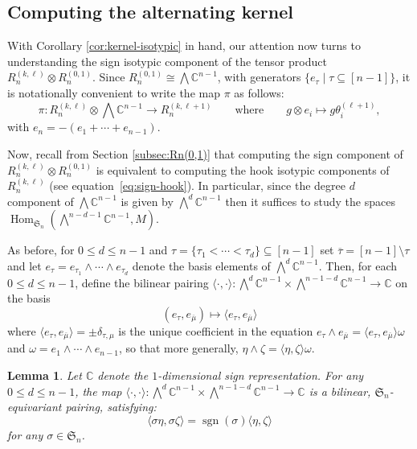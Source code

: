 \documentclass[11pt, reqno]{amsart}
\newtheorem{lemma}[theorem]{Lemma}
\theoremstyle{definition}
\theoremstyle{remark}
\numberwithin{equation}{section}
\newcommand{\0}{\emptyset}
\newcommand{\C}{\mathbb{C}}
\renewcommand{\S}{\mathfrak{S}}
\DeclareMathOperator{\sgn}{sgn}
\DeclareMathOperator{\Hom}{Hom}
\begin{document}
\subsection{Computing the alternating kernel}
With Corollary \ref{cor:kernel-isotypic} in hand, our attention now turns to understanding the sign isotypic component of the tensor product $R_n^{(k,\ell)}\otimes R_n^{(0,1)}$. Since $R_n^{(0,1)} \cong \bigwedge \C^{n-1}$, with generators $\{ e_\tau \mid \tau \subseteq [n-1]\}$, it is notationally convenient to write the map $\pi$ as follows:
\[
\pi: R_n^{(k,\ell)} \otimes \bigwedge \C^{n-1} \to R_n^{(k,\ell+1)}
\qquad \text{where} \qquad g \otimes e_i \mapsto g \theta_i^{(\ell+1)},
\]
with $e_n = -(e_1+\cdots+e_{n-1})$.

Now, recall from Section \ref{subsec:Rn(0,1)} that computing the sign component of $R_n^{(k,\ell)}\otimes R_n^{(0,1)}$ is equivalent to computing the hook isotypic components of $R_n^{(k,\ell)}$ (see equation~\eqref{eq:sign-hook}). 
In particular, since the degree $d$ component of $\bigwedge \C^{n-1}$ is given by $\bigwedge^d \C^{n-1}$ then it suffices to study the spaces $\Hom_{\S_n}\left(\bigwedge^{n-d-1}\C^{n-1}, M\right)$.

As before, for $0\leq d \leq n-1$ and $\tau = \{\tau_1<\cdots<\tau_d\} \subseteq [n-1]$ set $\overline{\tau}= [n-1]\setminus \tau$ and let $e_\tau = e_{\tau_1} \wedge \cdots \wedge e_{\tau_d}$ denote the basis elements of $\bigwedge^d \C^{n-1}$.  
Then, for each $0 \leq d \leq n-1$, define the bilinear pairing
 $\langle \cdot, \cdot \rangle: \bigwedge^d \C^{n-1} \times \bigwedge^{n-1-d} \C^{n-1} \to \C$ on the basis
\[
    (e_\tau, e_{\overline{\mu}}) \mapsto \langle e_\tau, e_{\overline{\mu}}\rangle 
\]
where $\langle e_\tau, e_{\overline{\mu}}\rangle =\pm \delta_{\tau,\mu}$ 
is the unique coefficient in the equation 
$e_\tau \wedge e_{\overline{\mu}} = \langle e_\tau, e_{\overline{\mu}}\rangle  \omega$ and $\omega = e_1 \wedge \cdots \wedge e_{n-1}$, so that more generally, $\eta \wedge \zeta = \langle \eta,\zeta \rangle \omega$. 

\begin{lemma}\label{lem:pairing-equivariant}
    Let $\C$ denote the $1$-dimensional sign representation.
    For any $0\leq d \leq n-1$,
    the map 
    $\langle \cdot, \cdot \rangle : \bigwedge^d \C^{n-1} \times \bigwedge^{n-1-d} \C^{n-1} \to\C $ 
    is a bilinear, $\S_n$-equivariant pairing, satisfying:
    \[
        \langle \sigma \eta, \sigma \zeta\rangle = \sgn(\sigma) \langle \eta,\zeta\rangle
    \]
    for any $\sigma \in \S_n$.
\end{lemma}
\end{document}
